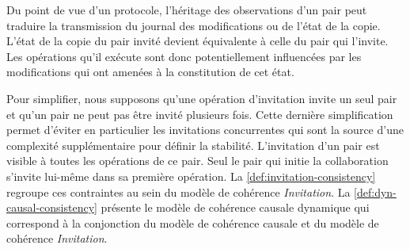 Du point de vue d'un protocole, l'héritage des observations d'un pair peut traduire la transmission du journal des modifications ou de l'état de la copie.
L'état de la copie du pair invité devient équivalente à celle du pair qui l'invite.
Les opérations qu'il exécute sont donc potentiellement influencées par les modifications qui ont amenées à la constitution de cet état.

Pour simplifier, nous supposons qu'une opération d'invitation invite un seul pair et qu'un pair ne peut pas être invité plusieurs fois.
Cette dernière simplification permet d'éviter en particulier les invitations concurrentes qui sont la source d'une complexité supplémentaire pour définir la stabilité.
L'invitation d'un pair est visible à toutes les opérations de ce pair.
Seul le pair qui initie la collaboration s'invite lui-même dans sa première opération.
La \autoref{def:invitation-consistency} regroupe ces contraintes au sein du modèle de cohérence \emph{Invitation}.
La \autoref{def:dyn-causal-consistency} présente le modèle de cohérence causale dynamique qui correspond à la conjonction du modèle de cohérence causale et du modèle de cohérence \emph{Invitation}.


